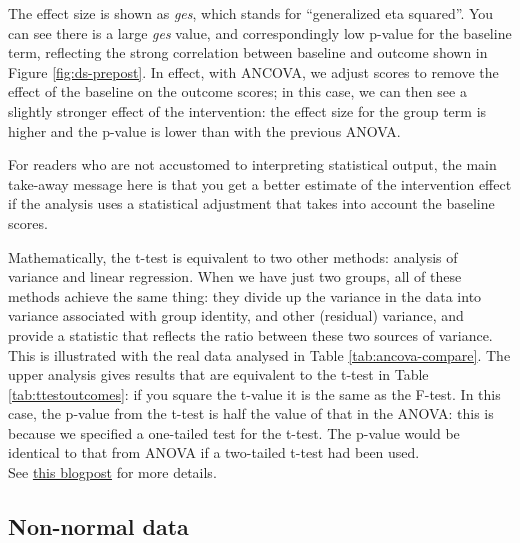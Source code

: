 \documentclass{krantz}
\begin{document}
The effect size is shown as \emph{ges}, which stands for ``generalized eta squared''. You can see there is a large \emph{ges} value, and correspondingly low p-value for the baseline term, reflecting the strong correlation between baseline and outcome shown in Figure \ref{fig:ds-prepost}. In effect, with ANCOVA, we adjust scores to remove the effect of the baseline on the outcome scores; in this case, we can then see a slightly stronger effect of the intervention: the effect size for the group term is higher and the p-value is lower than with the previous ANOVA.

For readers who are not accustomed to interpreting statistical output, the main take-away message here is that you get a better estimate of the intervention effect if the analysis uses a statistical adjustment that takes into account the baseline scores.

\begin{tcolorbox}[colback=Black!5!lightgray,colframe=black!75!black,coltitle=white,title= {T-tests, analysis of variance, and linear regression}]
Mathematically, the t-test is equivalent to two other methods: analysis of variance and linear regression. When we have just two groups, all of these methods achieve the same thing: they divide up the variance in the data into variance associated with group identity, and other (residual) variance, and provide a statistic that reflects the ratio between these two sources of variance. This is illustrated with the real data analysed in Table \ref{tab:ancova-compare}. The upper analysis gives results that are equivalent to the t-test in Table \ref{tab:ttestoutcomes}: if you square the t-value it is the same as the F-test. In this case, the p-value from the t-test is half the value of that in the ANOVA: this is because we specified a one-tailed test for the t-test. The p-value would be identical to that from ANOVA if a two-tailed t-test had been used.\\
See \href{http://deevybee.blogspot.com/2017/11/anova-t-tests-and-regression-different.html}{this blogpost} for more details.
\end{tcolorbox}



\hypertarget{non-normal-data}{%
\subsection{Non-normal data}\label{non-normal-data}}
\end{document}
